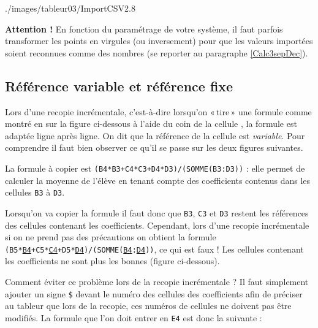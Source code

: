 %
		{./images/tableur03/ImportCSV2}{.8\textwidth}


\textbf{Attention !} En fonction du paramétrage de votre système, il faut parfois transformer les points en virgules (ou inversement) pour que les valeurs importées soient reconnues comme des nombres (se reporter au paragraphe \vref{Calc3sepDec}).



\subsection{Référence variable et référence fixe}\label{Calc3reference} 

Lors d'une recopie incrémentale, c'est-à-dire lorsqu'on «\,tire\,» une formule comme montré en  sur la figure ci-dessous à l'aide du coin de la cellule , la formule est adaptée ligne après ligne. On dit que la référence de la cellule est \emph{variable}. Pour comprendre il faut bien observer ce qu'il se passe sur les deux figures suivantes.


La formule à copier est \texttt{(B4*B3+C4*C3+D4*D3)/(SOMME(B3:D3))} : elle permet de calculer la moyenne de l'élève en tenant compte des coefficients contenus dans les cellules \texttt{B3} à \texttt{D3}.

Lorsqu'on va copier la formule il faut donc que \texttt{B3}, \texttt{C3} et \texttt{D3} restent les références des cellules contenant les coefficients. Cependant, lors d'une recopie incrémentale si on ne prend pas des précautions on obtient la formule \texttt{(B5*\underline{B4}+C5*\underline{C4}+D5*\underline{D4})/(SOMME(\underline{B4}:\underline{D4}))}, ce qui est faux ! Les cellules contenant les coefficients ne sont plus les bonnes (figure ci-dessous).


Comment éviter ce problème lors de la recopie incrémentale ? Il faut simplement ajouter un signe \texttt{\$} devant le numéro des cellules des coefficients afin de préciser au tableur que lors de la recopie, ces numéros de cellules ne doivent pas être modifiés. La formule que l'on doit entrer en \texttt{E4} est donc la suivante :

